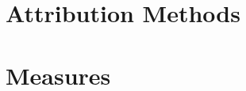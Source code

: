 \chapter{Attribution Methods}\label{chapter:methods}
\thispagestyle{chapterBeginStyle}

\vspace{-20mm}








\chapter{Measures}\label{chapter:measures}
\thispagestyle{chapterBeginStyle}

\vspace{-20mm}



